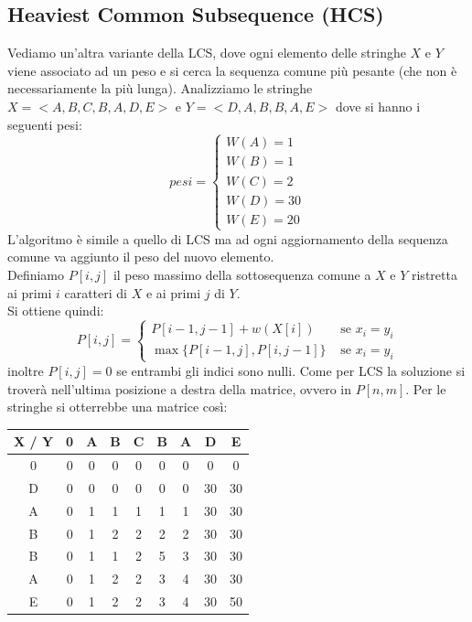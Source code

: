 \documentclass[a4paper,12pt, oneside]{book}
\begin{document}
\subsection{Heaviest Common Subsequence (HCS)}
Vediamo un'altra variante della LCS, dove ogni elemento delle stringhe
$X$ e $Y$ viene associato ad un peso e si cerca la sequenza comune più
pesante (che non è necessariamente la più lunga). Analizziamo le
stringhe $X=<A,B,C,B,A,D,E>$ e $Y=<D,A,B,B,A,E>$ dove si hanno i
seguenti pesi:
\[pesi=
  \begin{cases}
    W(A)=1\\
    W(B)=1\\
    W(C)=2\\
    W(D)=30\\
    W(E)=20
  \end{cases}
\]
L'algoritmo è simile a quello di LCS ma ad ogni aggiornamento della
sequenza comune va aggiunto il peso del nuovo elemento.\\
Definiamo $P[i,j]$ il peso massimo della sottosequenza comune a $X$ e
$Y$ ristretta ai primi $i$ caratteri di $X$ e ai primi $j$ di $Y$.\\
Si ottiene quindi:
\[
  P[i,j]=\begin{cases}
    P[i-1,j-1]+w(X[i]) & \mbox{ se } x_i=y_i\\
    \max\{P[i-1,j],P[i, j-1]\} & \mbox{ se } x_i=y_i
  \end{cases}
\]
inoltre $P[i,j]=0$ se entrambi gli indici sono nulli.
Come per LCS la soluzione si troverà nell'ultima posizione a destra
della matrice, ovvero in $P[n,m]$. Per le stringhe si otterrebbe una
matrice così:
\begin{center}
  \begin{tabular}{|c|c|c|c|c|c|c|c|c|}
    \hline
    X / Y & {0} & {A} & {B} & {C} & {B} & {A} & {D} & {E} \\
    \hline
    {0} & {0} & {0} & {0} & {0} & {0} & {0} & {0} & {0} \\
    \hline
    {D} & {0} & {0} & {0} & {0} & {0} & {0} & {30} & {30} \\
    \hline
    {A} & {0} & {1} & {1} & {1} & {1} & {1} & {30} & {30}\\
    \hline
    {B} & {0} & {1} & {2} & {2} & {2} & {2} & {30} & {30}\\
    \hline
    {B} & {0} & {1} & {1} & {2} & {5} & {3} & {30} & {30}\\
    \hline
    {A} & {0} & {1} & {2} & {2} & {3} & {4} & {30} & {30}\\
    \hline
    {E} & {0} & {1} & {2} & {2} & {3} & {4} & {30} & {50}\\
    \hline
  \end{tabular}
\end{center}
\end{document}
